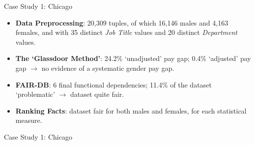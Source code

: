 \documentclass[usenames,dvipsnames]{beamer}
\begin{document}
    
    \begin{frame}{Case Study 1: Chicago}
        \begin{itemize}
            \item \textbf{Data Preprocessing}: 20,309 tuples, of which 16,146 males and 4,163 females, and with 35 distinct \textit{Job Title} values and 20 distinct \textit{Department} values.\newline
            \item \textbf{The `Glassdoor Method'}: 24.2\% `unadjusted' pay gap; 0.4\% `adjusted' pay gap $\rightarrow$ no evidence of a systematic gender pay gap.
            \item \textbf{FAIR-DB}: 6 final functional dependencies; 11.4\% of the dataset `problematic' $\rightarrow$ dataset quite fair.
            \item \textbf{Ranking Facts}: dataset fair for both males and females, for each statistical measure.
        \end{itemize}
    \end{frame}
    
    
    \begin{frame}{Case Study 1: Chicago}
        \begin{figure}
            \hfill
        \end{figure}
    \end{frame}
    
\end{document}
